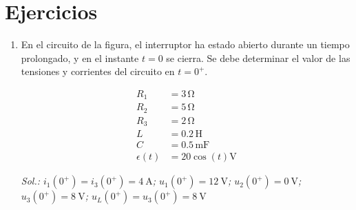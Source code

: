 \section*{Ejercicios}

\begin{enumerate}

\item En el circuito de la figura, el interruptor ha estado abierto durante un tiempo
prolongado, y en el instante $t = 0$ se cierra. Se debe determinar el valor de las tensiones y corrientes del circuito en $t = 0^+$.

\begin{minipage}{0.5\linewidth}
\end{minipage}
\begin{minipage}{0.5\linewidth}
  \begin{align*}
    R_1 &= 3\,\unit{\ohm}\\
    R_2 &= 5\,\unit{\ohm}\\
    R_3 &= 2\,\unit{\ohm}\\
    L &= 0.2\,\unit{\henry}\\
    C &= 0.5\,\unit{\milli\farad}\\
    \epsilon(t) &= 20\cos(t)\unit{\volt}
  \end{align*}
\end{minipage}

\vspace{2mm}
\emph{Sol.:\;   $i_1(0^+) = i_3(0^+) = \qty{4}{\ampere}$;\; 
  $u_1(0^+) = \qty{12}{\volt}$;\;
  $u_2(0^+) = \qty{0}{\volt}$;\;
  $u_3(0^+) = \qty{8}{\volt}$;\;
  $u_L(0^+) = u_3(0^+) = \qty{8}{\volt}$
}


\end{enumerate}
